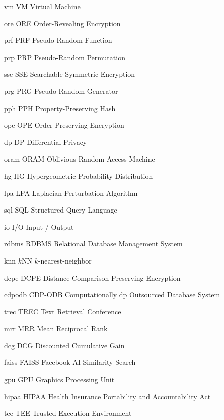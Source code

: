 
\newacronym%
	{vm}
	{VM}
	{Virtual Machine}

\newacronym%
	{ore}
	{ORE}
	{Order-Revealing Encryption}

\newacronym%
	{prf}
	{PRF}
	{Pseudo-Random Function}

\newacronym%
	{prp}
	{PRP}
	{Pseudo-Random Permutation}

\newacronym%
	{sse}
	{SSE}
	{Searchable Symmetric Encryption}

\newacronym%
	{prg}
	{PRG}
	{Pseudo-Random Generator}

\newacronym%
	{pph}
	{PPH}
	{Property-Preserving Hash}

\newacronym%
	{ope}
	{OPE}
	{Order-Preserving Encryption}

\newacronym%
	{dp}
	{DP}
	{Differential Privacy}

\newacronym%
	{oram}
	{ORAM}
	{Oblivious Random Access Machine}

\newacronym%
	{hg}
	{HG}
	{Hypergeometric Probability Distribution}

\newacronym%
	{lpa}
	{LPA}
	{Laplacian Perturbation Algorithm}

\newacronym%
	{sql}
	{SQL}
	{Structured Query Language}

\newacronym%
	{io}
	{I/O}
	{Input / Output}

\newacronym%
	{rdbms}
	{RDBMS}
	{Relational Database Management System}

\newacronym%
	{knn}
	{\ensuremath{k}NN}
	{$k$-nearest-neighbor}

\newacronym%
	{dcpe}
	{DCPE}
	{Distance Comparison Preserving Encryption}

\newacronym%
	{cdpodb}
	{CDP-ODB}
	{Computationally \acrshort{dp} Outsourced Database System}

\newacronym%
	{trec}
	{TREC}
	{Text Retrieval Conference}

\newacronym%
	{mrr}
	{MRR}
	{Mean Reciprocal Rank}

\newacronym%
	{dcg}
	{DCG}
	{Discounted Cumulative Gain}

\newacronym%
	{faiss}
	{FAISS}
	{Facebook AI Similarity Search}

\newacronym%
	{gpu}
	{GPU}
	{Graphics Processing Unit}

\newacronym%
	{hipaa}
	{HIPAA}
	{Health Insurance Portability and Accountability Act}

\newacronym%
	{tee}
	{TEE}
	{Trusted Execution Environment}

